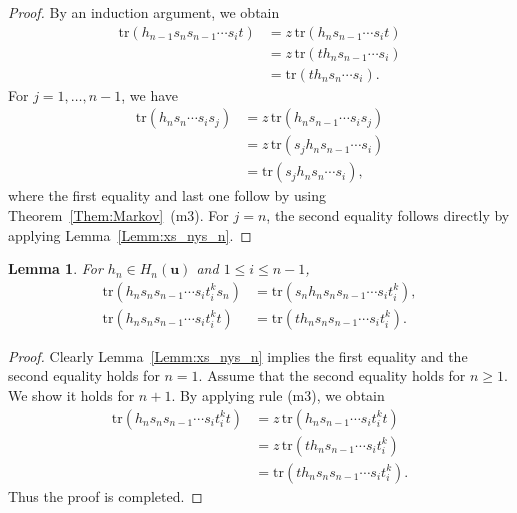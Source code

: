 \documentclass[a4paper, oneside]{amsart}
\numberwithin{equation}{section}
\newtheorem{lemma}[equation]{Lemma}
\theoremstyle{definition}
\theoremstyle{remark}
\begin{document}
\begin{proof} By an induction argument, we obtain
\begin{align*}
\mathrm{tr}(h_{n-1}s_ns_{n-1}\cdots s_it)&=z\mathrm{\,tr}(h_{n}s_{n-1}\cdots s_it)\\
 &=z\mathrm{\,tr}(th_{n}s_{n-1}\cdots s_i)\\
 &=\mathrm{tr}(th_{n}s_n\cdots s_i). \end{align*}
 For $j=1, \ldots, n-1$, we have
 \begin{align*}
 \mathrm{tr}(h_{n}s_n\cdots s_is_j)&=z\mathrm{\,tr}(h_{n}s_{n-1}\cdots s_is_j)\\
 &=z\mathrm{\,tr}(s_jh_{n}s_{n-1}\cdots s_i)\\
 &=\mathrm{tr}(s_jh_{n}s_n\cdots s_i), \end{align*}
 where the first equality and last one follow by using Theorem~\ref{Them:Markov}~(m3). For $j=n$, the second equality follows directly by applying Lemma~\ref{Lemm:xs_nys_n}.
 \end{proof}

\begin{lemma}\label{Lemm:Typer-III}For $h_{n}\in H_{n}(\boldsymbol{u})$ and $1\leq i\leq n-1$,  \begin{align*}
\mathrm{tr}(h_{n}s_ns_{n-1}\cdots s_{i}t_{i}^ks_n)&=
\mathrm{tr}(s_nh_{n}s_ns_{n-1}\cdots s_{i}t_{i}^k),\\
\mathrm{tr}(h_{n}s_ns_{n-1}\cdots s_{i}t_{i}^kt)&=
\mathrm{tr}(th_{n}s_ns_{n-1}\cdots s_{i}t_{i}^k).
\end{align*}
\end{lemma}
\begin{proof}Clearly Lemma~\ref{Lemm:xs_nys_n} implies the first equality and the second equality holds for $n=1$. Assume that the second equality holds for $n\geq 1$. We show it holds for $n+1$. By applying rule (m3), we obtain
\begin{align*}
\mathrm{tr}(h_{n}s_ns_{n-1}\cdots s_{i}t_{i}^kt)&=z\,
\mathrm{tr}(h_{n}s_{n-1}\cdots s_{i}t_{i}^kt)\\
&=z\,\mathrm{tr}(th_{n}s_{n-1}\cdots s_{i}t_{i}^k)\\
&=\mathrm{tr}(th_{n}s_ns_{n-1}\cdots s_{i}t_{i}^k).
\end{align*}
Thus the proof is completed.
\end{proof}
\end{document}
